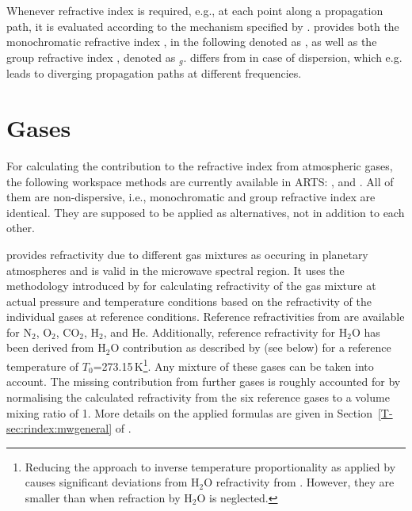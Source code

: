Whenever refractive index is required, e.g., at each point along a propagation
path, it is evaluated according to the mechanism specified by
. 
provides both the monochromatic refractive index ,
in the following denoted as \Rfr, as well as the group refractive index
, denoted as \Rfr$_{g}$.
 differs from 
in case of dispersion, which e.g. leads to diverging
propagation paths at different frequencies.


\section{Gases}
%
For calculating the contribution to the refractive index from atmospheric
gases, the following workspace methods are currently available in ARTS:
,  and
. All of them are non-dispersive, i.e.,
monochromatic and group refractive index are identical. They are supposed to be
applied as alternatives, not in addition to each other.

 provides refractivity due to different gas
mixtures as occuring in planetary atmospheres and is valid in the microwave
spectral region. It uses the methodology introduced by
\citet{newell65:_absolute_jap} for calculating refractivity of the gas mixture
at actual pressure and temperature conditions based on the refractivity of the
individual gases at reference conditions. Reference refractivities from
\citet{newell65:_absolute_jap} are available for N$_2$, O$_2$, CO$_2$, H$_2$,
and He.  Additionally, reference refractivity for H$_2$O has been derived from
H$_2$O contribution as described by  (see
below) for a reference temperature of $T_0$=273.15\,K\footnote{Reducing the
 approach to inverse temperature
proportionality as applied by  causes
significant deviations from H$_2$O refractivity from
. However, they are smaller than when
refraction by H$_2$O is neglected.}.
Any mixture of these gases can be taken into account. The missing
contribution from further gases is roughly accounted for by
normalising the calculated refractivity from the six reference gases to a
volume mixing ratio of 1. More details on the applied formulas are given in
Section~\ref{T-sec:rindex:mwgeneral} of \theory.

